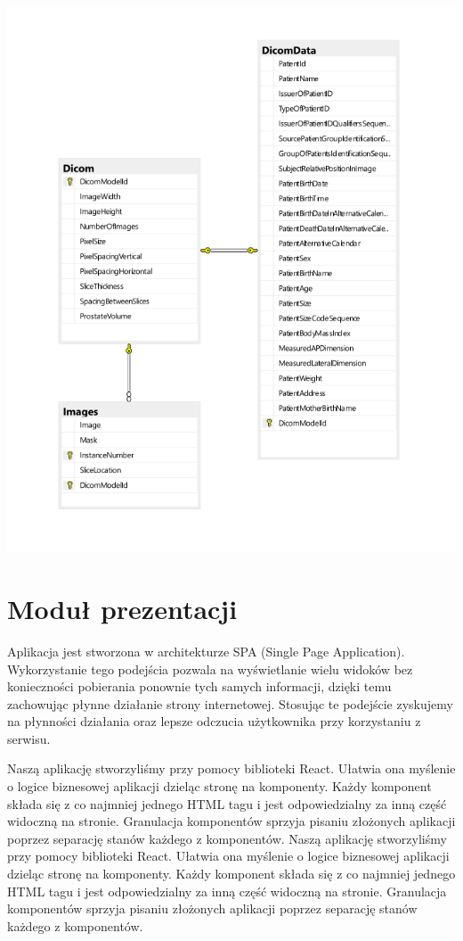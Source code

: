 \documentclass[a4paper,11pt,twoside]{report}
\theoremstyle{definition}
\begin{document}
\begin{minipage}{\linewidth}
	\centering
	\includegraphics[width=\textwidth]{Backend/SchematBazy.png}
\end{minipage}

\section{Moduł prezentacji}
Aplikacja jest stworzona w architekturze SPA (Single Page Application). Wykorzystanie tego podejścia pozwala na wyświetlanie wielu widoków bez konieczności pobierania ponownie tych samych informacji, dzięki temu zachowując płynne działanie strony internetowej. Stosując te podejście zyskujemy na płynności działania oraz lepsze odczucia użytkownika przy korzystaniu z serwisu.

Naszą aplikację stworzyliśmy przy pomocy biblioteki React. Ułatwia ona myślenie o logice biznesowej aplikacji dzieląc stronę na komponenty. Każdy komponent składa się z co najmniej jednego HTML tagu i jest odpowiedzialny za inną część widoczną na stronie. Granulacja komponentów sprzyja pisaniu złożonych aplikacji poprzez separację stanów każdego z komponentów.
Naszą aplikację stworzyliśmy przy pomocy biblioteki React. Ułatwia ona myślenie o logice biznesowej aplikacji dzieląc stronę na komponenty. Każdy komponent składa się z co najmniej jednego HTML tagu i jest odpowiedzialny za inną część widoczną na stronie. Granulacja komponentów sprzyja pisaniu złożonych aplikacji poprzez separację stanów każdego z komponentów.
\end{document}

